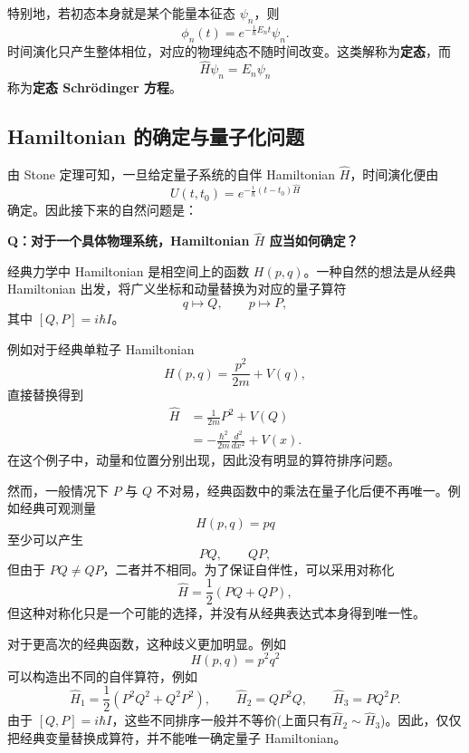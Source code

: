 \documentclass[UTF8,a4paper,11pt,openany]{ctexbook}
\begin{document}
特别地，若初态本身就是某个能量本征态 $\psi_n$，则
\begin{equation}
    \phi_n(t)
    =
    e^{-\frac{i}{\hbar}E_nt}\psi_n.
\end{equation}
时间演化只产生整体相位，对应的物理纯态不随时间改变。这类解称为\textbf{定态}，而
\begin{equation}
    \hat H\psi_n=E_n\psi_n
\end{equation}
称为\textbf{定态 Schrödinger 方程}。

\subsection{Hamiltonian 的确定与量子化问题}

由 Stone 定理可知，一旦给定量子系统的自伴 Hamiltonian $\hat H$，时间演化便由
\[
U(t,t_0)=e^{-\frac{i}{\hbar}(t-t_0)\hat H}
\]
确定。因此接下来的自然问题是：

\textbf{Q：对于一个具体物理系统，Hamiltonian $\hat H$ 应当如何确定？}

经典力学中 Hamiltonian 是相空间上的函数 $H(p,q)$。一种自然的想法是从经典 Hamiltonian 出发，将广义坐标和动量替换为对应的量子算符
\[
q\longmapsto Q,\qquad p\longmapsto P,
\]
其中 $[Q,P]=i\hbar I$。

例如对于经典单粒子 Hamiltonian
\[
H(p,q)=\frac{p^2}{2m}+V(q),
\]
直接替换得到
\begin{align}
    \hat H
    &=
    \frac{1}{2m}P^2+V(Q)
    \nonumber\\
    &=
    -\frac{\hbar^2}{2m}\frac{d^2}{dx^2}+V(x).
\end{align}
在这个例子中，动量和位置分别出现，因此没有明显的算符排序问题。

然而，一般情况下 $P$ 与 $Q$ 不对易，经典函数中的乘法在量子化后便不再唯一。例如经典可观测量
\[
H(p,q)=pq
\]
至少可以产生
\[
PQ,\qquad QP,
\]
但由于 $PQ\neq QP$，二者并不相同。为了保证自伴性，可以采用对称化
\begin{equation}
    \hat H=\frac12(PQ+QP),
\end{equation}
但这种对称化只是一个可能的选择，并没有从经典表达式本身得到唯一性。

对于更高次的经典函数，这种歧义更加明显。例如
\[
H(p,q)=p^2q^2
\]
可以构造出不同的自伴算符，例如
\begin{equation}
    \hat H_1=\frac12(P^2Q^2+Q^2P^2),\qquad
    \hat H_2=QP^2Q,\qquad
    \hat H_3=PQ^2P.
\end{equation}
由于 $[Q,P]=i\hbar I$，这些不同排序一般并不等价(上面只有$\hat H_2 \sim \hat H_3$)。因此，仅仅把经典变量替换成算符，并不能唯一确定量子 Hamiltonian。
\end{document}
